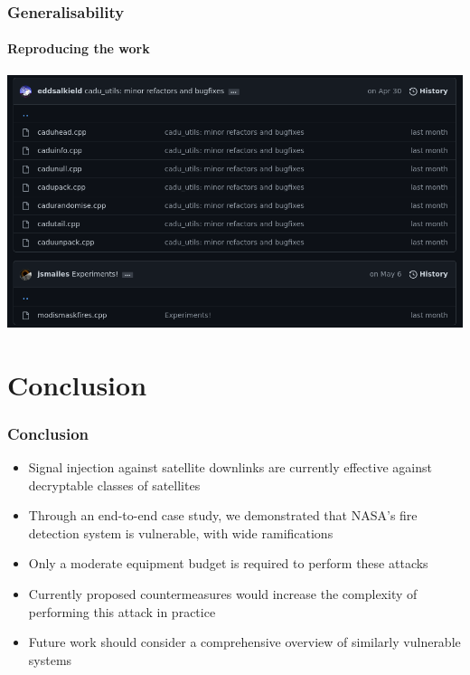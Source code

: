 \documentclass{beamer}
\begin{document}
\begin{frame}
  \frametitle{Generalisability}
  \framesubtitle{Reproducing the work}
  \includegraphics[width=\textwidth]{images/code_tools.png}
\end{frame}

\section{Conclusion}

\begin{frame}
  \frametitle{Conclusion}
  \begin{itemize}
    \item Signal injection against satellite downlinks are currently effective against decryptable classes of satellites
    \item Through an end-to-end case study, we demonstrated that NASA's fire detection system is vulnerable, with wide ramifications
    \item Only a moderate equipment budget is required to perform these attacks
    \item Currently proposed countermeasures would increase the complexity of performing this attack in practice
    \item Future work should consider a comprehensive overview of similarly vulnerable systems
  \end{itemize}
\end{frame}

\end{document}
